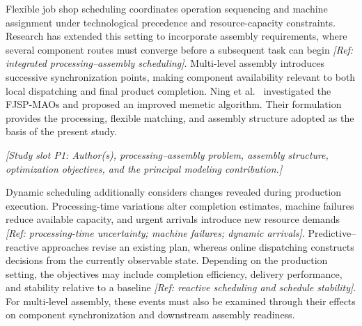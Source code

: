 Flexible job shop scheduling coordinates operation sequencing and machine assignment under technological precedence
and resource-capacity constraints. Research has extended this setting to incorporate assembly requirements,
where several component routes must converge before a subsequent task can begin \textit{[Ref:
integrated processing--assembly scheduling]}. Multi-level assembly introduces successive synchronization points,
making component availability relevant to both local dispatching and final product completion.
Ning et al.~\cite{ning2027fjspmaos} investigated the FJSP-MAOs and proposed an improved memetic algorithm.
Their formulation provides the processing, flexible matching, and assembly structure adopted as the basis of the present study.


\textit{[Study slot P1: Author(s), processing--assembly problem, assembly structure, optimization objectives,
and the principal modeling contribution.]}

Dynamic scheduling additionally considers changes revealed during production execution.
Processing-time variations alter completion estimates, machine failures reduce available capacity,
and urgent arrivals introduce new resource demands \textit{[Ref: processing-time uncertainty;
machine failures; dynamic arrivals]}. Predictive--reactive approaches revise an existing plan,
whereas online dispatching constructs decisions from the currently observable state.
Depending on the production setting, the objectives may include completion efficiency, delivery performance,
and stability relative to a baseline \textit{[Ref: reactive scheduling and schedule stability]}.
For multi-level assembly, these events must also be examined through their effects on component synchronization
and downstream assembly readiness.

